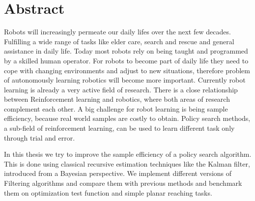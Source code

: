 
\chapter*{Abstract}

Robots will increasingly permeate our daily lifes over the next few decades.
Fulfilling a wide range of tasks like elder care, search
and rescue and general assistance in daily life.
Today most robots rely on being
taught and programmed by a skilled human operator.
For robots to become part of daily life they need to cope
with changing environments and adjust to new situations,
therefore problem of autonomously learning robotics will become more
important. Currently robot learning is already
a very active field of research. There is a close relationship between Reinforcement learning and
robotics, where both areas of research complement each other.
A big challenge for robot learning is being sample efficiency,
because real world samples are costly to obtain.
Policy search methods, a sub-field of reinforcement learning,
can be used to learn different task only through trial and error.


In this thesis we try to improve the sample efficiency
of a policy search algorithm.
This is done using classical recursive estimation
techniques like the Kalman filter, introduced from a Bayesian perspective.
We implement different versions of Filtering algorithms and compare them with
previous methods and benchmark them on optimization test function and simple
planar reaching tasks.